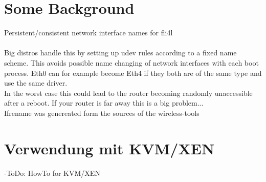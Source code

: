 \section {Some Background}

Persistent/consistent network interface names for fli4l\\
\\
Big distros handle this by setting up udev rules according to a fixed
name scheme. This avoids possible name changing of network interfaces
with each boot process. Eth0 can for example become Eth4 if they both
are of the same type and use the same driver.\\

In the worst case this could lead to the router becoming randomly unaccessible
after a reboot. If your router is far away this is a big problem...\\

Ifrename was genereated form the sources of the wireless-tools\\


\section {Verwendung mit KVM/XEN}
	-ToDo: HowTo for KVM/XEN 



